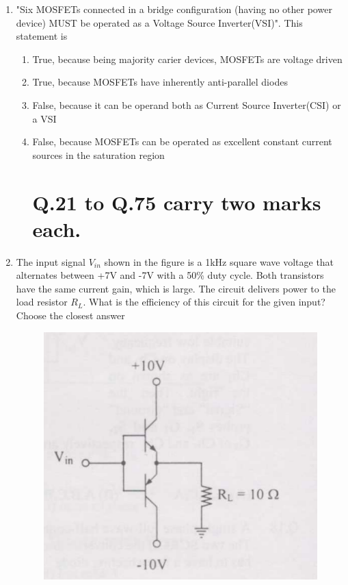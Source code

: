 \documentclass[journal,,12pt,onecolumn]{IEEEtran}
\theoremstyle{remark}
\begin{document}
\begin{enumerate}
\begin{enumerate}
\end{enumerate}
\bigskip
\item "Six MOSFETs connected in a bridge configuration (having no other power device) MUST be operated as a Voltage Source Inverter(VSI)". This statement is
\begin{enumerate}
    \item True, because being majority carier devices, MOSFETs are voltage driven
    \item True, because MOSFETs have inherently anti-parallel diodes 
    \item False, because it can be operand both as Current Source Inverter(CSI) or a VSI
    \item False, because MOSFETs can be operated as excellent constant current sources in the saturation region
\section*{Q.21 to Q.75 carry two marks each.}
\end{enumerate}
\bigskip
\item The input signal $V_{in}$ shown in the figure is a 1kHz square wave voltage that alternates between +7V and -7V with a 50\% duty cycle. Both transistors have the same current gain, which is large. The circuit delivers power to the load resistor $R_L$. What is the efficiency of this circuit for the given input? Choose the closest answer
\begin{figure}[H]
   \centering
   \includegraphics[width=0.7\linewidth]{figs/fig_2.png}
   \label{stemplot}
\end{figure}


\end{enumerate}
\end{document}
